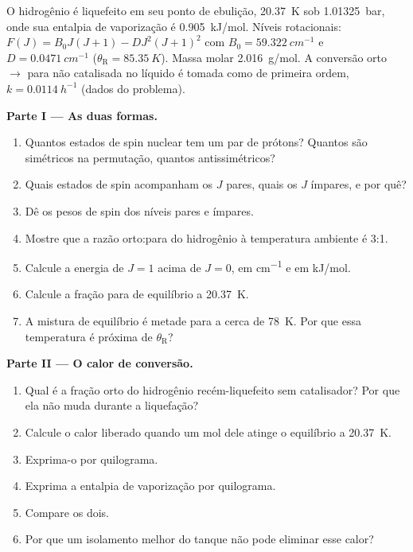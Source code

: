 \begin{problem}
\label{pb:b3:statistical-thermo-applied:1}
O hidrogênio é liquefeito em seu ponto de ebulição, \qty{20.37}{K} sob \qty{1.01325}{bar}, onde sua
entalpia de vaporização é \qty{0.905}{kJ/mol}. Níveis rotacionais: $F(J) = B_0J(J+1) -
D J^2(J+1)^2$ com $B_0 = \qty{59.322}{cm^{-1}}$ e $D = \qty{0.0471}{cm^{-1}}$ ($\theta_{\mathrm R} = \qty{85.35}{K}$).
Massa molar \qty{2.016}{g/mol}. A conversão orto $\to$ para não catalisada no líquido
é tomada como de primeira ordem, $k = \qty{0.0114}{h^{-1}}$ (dados do problema).

\medskip\noindent\textbf{Parte I --- As duas formas.}
\begin{enumerate}
  \item Quantos estados de spin nuclear tem um par de prótons? Quantos são
        simétricos na permutação, quantos antissimétricos?
  \item Quais estados de spin acompanham os $J$ pares, quais os $J$ ímpares, e por quê?
  \item Dê os pesos de spin dos níveis pares e ímpares.
  \item Mostre que a razão orto:para do hidrogênio à temperatura ambiente é 3:1.
  \item Calcule a energia de $J = 1$ acima de $J = 0$, em \unit{cm^{-1}} e em
        \unit{kJ/mol}.
  \item Calcule a fração para de equilíbrio a \qty{20.37}{K}.
  \item A mistura de equilíbrio é metade para a cerca de \qty{78}{K}. Por que essa
        temperatura é próxima de $\theta_{\mathrm R}$?
\end{enumerate}

\medskip\noindent\textbf{Parte II --- O calor de conversão.}
\begin{enumerate}[resume]
  \item Qual é a fração orto do hidrogênio recém-liquefeito sem catalisador? Por
        que ela não muda durante a liquefação?
  \item Calcule o calor liberado quando um mol dele atinge o equilíbrio a
        \qty{20.37}{K}.
  \item Exprima-o por quilograma.
  \item Exprima a entalpia de vaporização por quilograma.
  \item Compare os dois.
  \item Por que um isolamento melhor do tanque não pode eliminar esse calor?
\end{enumerate}


\end{problem}
